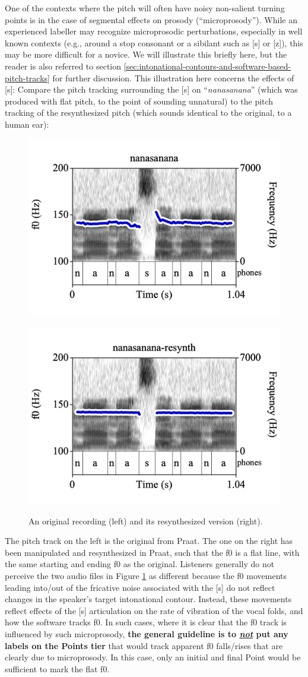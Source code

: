 \documentclass[11pt, twoside]{memoir}
\def\langtext#1{\textit{#1}}
\begin{document}
{{One of the contexts where the pitch will often have noisy non-salient turning points is in the case of segmental effects on prosody (“microprosody”). While an experienced labeller may recognize microprosodic perturbations, especially in well known contexts (e.g., around a stop consonant or a sibilant such as [s] or [z]), this may be more difficult for a novice. We will illustrate this briefly here, but the reader is also referred to section \ref{sec:intonational-contours-and-software-based-pitch-tracks} for further discussion. This illustration here concerns the effects of [s]: Compare the pitch tracking surrounding the [s] on “\langtext{nanasanana}” (which was produced with flat pitch, to the point of sounding unnatural) to the pitch tracking of the resynthesized pitch (which sounds identical to the original, to a human ear):
\begin{figure}[H]
\centering
\includegraphics[width=.485\linewidth]{Points-nanasanana.png}~~\includegraphics[width=.485\linewidth]{Points-nanasanana-resynth.png}
\caption{An original recording (left) and its resynthesized version (right).
\label{fig:original and resynth}
}
\end{figure}
The pitch track on the left is the original from Praat. The one on the right has been manipulated and resynthesized in Praat, such that the f0 is a flat line, with the same starting and ending f0 as the original. Listeners generally do not perceive the two audio files in Figure \ref{fig:original and resynth} as different because the f0 movements leading into\slash out of the fricative noise associated with the [s] do not reflect changes in the speaker’s target intonational contour.  Instead, these movements reflect effects of the [s] articulation on the rate of vibration of the vocal folds, and how the software tracks f0. In such cases, where it is clear that the f0 track is influenced by such microprosody, \textbf{the general guideline is to \textit{\uline{not}} put any labels on the Points tier} that would track apparent f0 falls\slash rises that are clearly due to microprosody. In this case, only an initial and final Point would be sufficient to mark the flat f0.
}}
\end{document}
